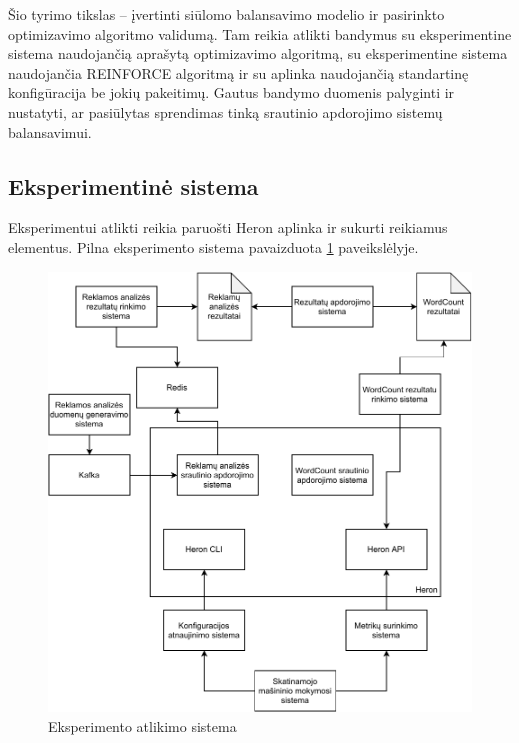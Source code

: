 \documentclass{VUMIFPSbakalaurinis}
\begin{document}
Šio tyrimo tikslas – įvertinti siūlomo balansavimo modelio ir pasirinkto optimizavimo algoritmo validumą. Tam reikia atlikti bandymus su eksperimentine sistema naudojančią aprašytą optimizavimo algoritmą, su eksperimentine sistema naudojančia REINFORCE algoritmą ir su aplinka naudojančią standartinę konfigūracija be jokių pakeitimų. Gautus bandymo duomenis palyginti ir nustatyti, ar pasiūlytas sprendimas tinką srautinio apdorojimo sistemų balansavimui.

\subsection{Eksperimentinė sistema}

Eksperimentui atlikti reikia paruošti Heron aplinka ir sukurti reikiamus elementus. Pilna eksperimento sistema pavaizduota \ref{experiment} paveikslėlyje.

\begin{figure}[H]
    \includegraphics[width=14cm]{img/Experiment.pdf}
    \caption{Eksperimento atlikimo sistema}
    \label{experiment}
\end{figure} 
\end{document}

